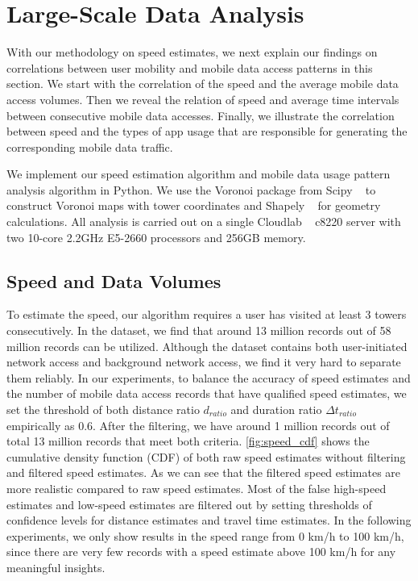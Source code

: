 \section{Large-Scale Data Analysis}\label{experiments}

With our methodology on speed estimates, we next explain our findings on correlations between user mobility and mobile data access patterns in this section. We start with the correlation of the speed and the average mobile data access volumes. Then we reveal the relation of speed and average time intervals between consecutive mobile data accesses. Finally, we illustrate the correlation between speed and the types of app usage that are responsible for generating the corresponding mobile data traffic.


We implement our speed estimation algorithm and mobile data usage pattern analysis algorithm in Python. We use the Voronoi package from Scipy ~\cite{scipy} to construct Voronoi maps with tower coordinates and Shapely ~\cite{shapely} for geometry calculations. All analysis is carried out on a single Cloudlab ~\cite{RicciEide:login14} c8220 server with two 10-core 2.2GHz E5-2660 processors and 256GB memory.


\subsection{Speed and Data Volumes}

To estimate the speed, our algorithm requires a user has visited at least 3 towers consecutively. In the dataset, we find that around 13 million records out of 58 million records can be utilized. Although the dataset contains both user-initiated network access and background network access, we find it very hard to separate them reliably. In our experiments, to balance the accuracy of speed estimates and the number of mobile data access records that have qualified speed estimates, we set the threshold of both distance ratio $d_{ratio}$ and duration ratio $\Delta t_{ratio}$ empirically as 0.6. After the filtering, we have around 1 million records out of total 13 million records that meet both criteria. \autoref{fig:speed_cdf} shows the cumulative density function (CDF) of both raw speed estimates without filtering and filtered speed estimates. As we can see that the filtered speed estimates are more realistic compared to raw speed estimates. Most of the false high-speed estimates and low-speed estimates are filtered out by setting thresholds of confidence levels for distance estimates and travel time estimates.
In the following experiments, we only show results in the speed range from 0 km/h to 100 km/h, since there are very few records with a speed estimate above 100 km/h for any meaningful insights.

